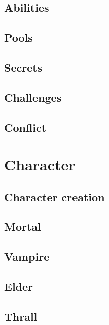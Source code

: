 \documentclass[a4paper, 12pt, finnish]{article}
\begin{document}
	\subsection{Abilities}\label{ssec:abilities}
		
	\subsection{Pools}\label{ssec:pools}
		
	\subsection{Secrets}\label{ssec:secrets}
		
	\subsection{Challenges}\label{ssec:challenges} %
		
	\subsection{Conflict}\label{ssec:conflict} %
		
\section{Character}
	\subsection{Character creation}\label{ssec:creation}
		
	\subsection{Mortal}\label{ssec:mortal}
		
	\subsection{Vampire}\label{ssec:vampire} %
		
	\subsection{Elder}\label{ssec:elder} %
		
	\subsection{Thrall}\label{ssec:thrall}
		
\end{document}
